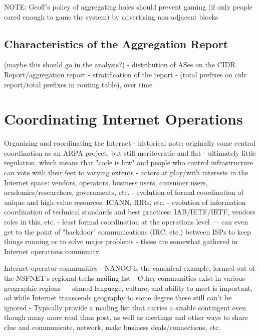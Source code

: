 NOTE: Geoff's policy of aggregating holes should prevent gaming (if only people cared enough to game the system) by advertising non-adjacent blocks

\subsection{Characteristics of the Aggregation Report}

(maybe this should go in the analysis?)
- distribution of ASes on the CIDR Report/aggregation report
- stratification of the report
- (total prefixes on cidr report/total prefixes in routing table), over time

\section{Coordinating Internet Operations}

Organizing and coordinating the Internet
       - historical note: originally some central coordination as an
         ARPA project, but still meritocratic and flat
       - ultimately little regulation, which means that "code is law"
         and people who control infrastructure can vote with their
         feet to varying extents
       - actors at play/with interests in the Internet space: vendors,
         operators, business users, consumer users,
         academics/researchers, governments, etc.
       - evolution of formal coordination of unique and high-value
         resources: ICANN, RIRs, etc.
       - evolution of information coordination of technical standards
         and best practices: IAB/IETF/IRTF, vendors roles in this, etc.
       - least formal coordination at the operations level — can even
         get to the point of "backdoor" communications (IRC, etc.)
         between ISPs to keep things running or to solve major problems
       - these are somewhat gathered in Internet operations community

Internet operator communities
       - NANOG is the canonical example, formed out of the NSFNET's
         regional techs mailing list
       - Other communities exist in various geographic regions —
         shared language, culture, and ability to meet is important,
         ad while Internet transcends geography to some degree these
         still can't be ignored
       - Typically provide a mailing list that carries a sizable
         contingent even though many more read than post, as well as
         meetings and other ways to share clue and communicate,
         network, make business deals/connections, etc.
